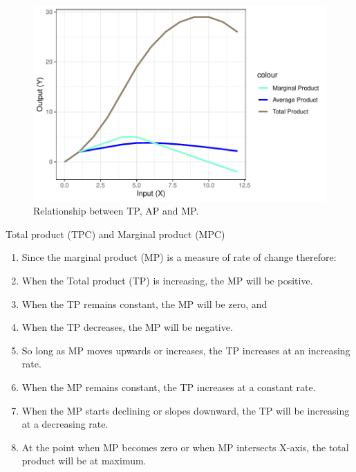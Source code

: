 \documentclass[12pt,ignorenonframetext,aspectratio=169]{beamer}
\providecommand{\tightlist}{%
  \setlength{\itemsep}{0pt}\setlength{\parskip}{0pt}}
\begin{document}
\begin{frame}{}
\protect\hypertarget{section-8}{}
\begin{figure}
\includegraphics[width=0.7\linewidth]{04-production_function_files/figure-beamer/tc-ac-mc-relationship-plot-1} \caption{Relationship between TP, AP and MP.}\label{fig:tc-ac-mc-relationship-plot}
\end{figure}
\end{frame}

\begin{frame}{Total product (TPC) and Marginal product (MPC)}
\protect\hypertarget{total-product-tpc-and-marginal-product-mpc}{}
\begin{enumerate}
\tightlist
\item
  Since the marginal product (MP) is a measure of rate of change
  therefore:
\item
  When the Total product (TP) is increasing, the MP will be positive.
\item
  When the TP remains constant, the MP will be zero, and
\item
  When the TP decreases, the MP will be negative.
\item
  So long as MP moves upwards or increases, the TP increases at an
  increasing rate.
\item
  When the MP remains constant, the TP increases at a constant rate.
\item
  When the MP starts declining or slopes downward, the TP will be
  increasing at a decreasing rate.
\item
  At the point when MP becomes zero or when MP intersects X-axis, the
  total product will be at maximum.
\end{enumerate}
\end{frame}
\end{document}
